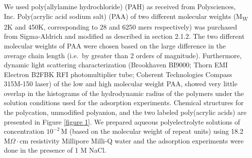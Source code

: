 \documentclass[journal=mamobx,manuscript=article]{achemso}
\begin{document}
We used poly(allylamine hydrochloride) (PAH) as received from Polysciences, Inc. Poly(acrylic acid sodium salt) (PAA) of two different molecular weights (M\textsubscript{W} 2K and 450K, corresponding to 28 and
6250 mers respectively) was purchased from Sigma-Aldrich and modified as described in section 2.1.2. 
The two different molecular weights of PAA were chosen based on the large difference in the average chain length (i.e.\ by greater than 2 orders of magnitude).  Furthermore, dynamic light scattering characterization (Brookhaven BI9000; Thorn EMI Electron B2FBK RFI photomultiplier tube; Coherent Technologies Compass 315M-150 laser) of the low and high molecular weight PAA, showed very little overlap in the histograms of the hydrodynamic radius of the polymers under the solution conditions used for the adsorption experiments.  Chemical structures for the polycation, unmodified polyanion, 
and the two labeled poly(acrylic acids) are presented in Figure \ref{figure 1}.  We prepared aqueous polyelectrolyte solutions of concentration $10^{-2}\,$M (based on the molecular weight of repeat units) using 18.2 M$\Omega\cdot$cm resistivity Millipore Milli-Q water and the adsorption experiments were done in the presence of 1 M NaCl.
%
\end{document}

